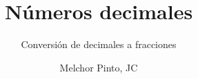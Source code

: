 \documentclass{guia}
\title{Números decimales}
\subtitle{Conversión de decimales a fracciones}
\author{Melchor Pinto, JC}
\begin{document}
%
\begin{questions}
\questionboxed{}
\end{questions}
\end{document}
